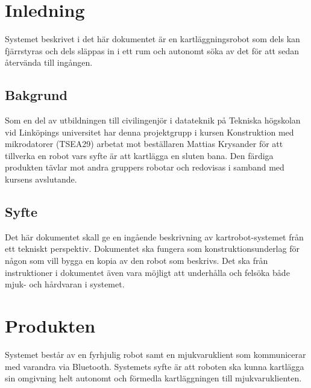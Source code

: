 \documentclass{article}
\begin{document}
\clearpage
\section{Inledning}
Systemet beskrivet i det här dokumentet är en kartläggningsrobot som dels kan fjärrstyras och dels släppas in i ett rum och autonomt söka av det för att sedan återvända till ingången.
\subsection{Bakgrund}
Som en del av utbildningen till civilingenjör i datateknik på Tekniska högskolan vid Linköpings universitet har denna projektgrupp i kursen Konstruktion med mikrodatorer (TSEA29) arbetat mot beställaren Mattias Krysander för att tillverka en robot vars syfte är att kartlägga en sluten bana. Den färdiga produkten tävlar mot andra gruppers robotar och redovisas i samband med kursens avslutande.

\subsection{Syfte}
Det här dokumentet skall ge en ingående beskrivning av kartrobot-systemet från ett tekniskt perspektiv. Dokumentet ska fungera som konstruktionsunderlag för någon som vill bygga en kopia av den robot som beskrivs. Det ska från instruktioner i dokumentet även vara möjligt att underhålla och felsöka både mjuk- och hårdvaran i systemet.

\clearpage
\section{Produkten}

Systemet består av en fyrhjulig robot samt en mjukvaruklient som kommunicerar med varandra via Bluetooth. Systemets syfte är att roboten ska kunna kartlägga sin omgivning helt autonomt och förmedla kartläggningen till mjukvaruklienten. 
\end{document}
